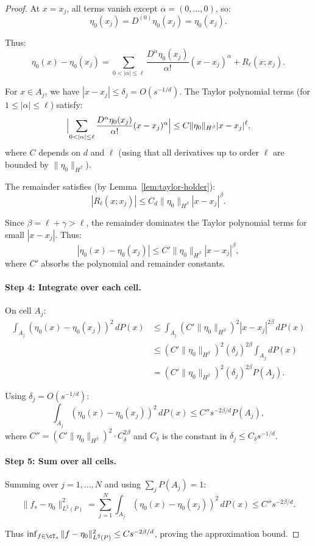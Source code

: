 \begin{proof}
At $x = x_j$, all terms vanish except $\alpha = (0,\ldots,0)$, so:
\[
\eta_0(x_j) = D^{(0)} \eta_0(x_j) = \eta_0(x_j).
\]

Thus:
\[
\eta_0(x) - \eta_0(x_j) = \sum_{0 < |\alpha| \le \ell} \frac{D^\alpha \eta_0(x_j)}{\alpha!} (x - x_j)^\alpha + R_\ell(x; x_j).
\]

For $x \in A_j$, we have $|x - x_j| \le \delta_j = O(s^{-1/d})$. The Taylor polynomial terms (for $1 \le |\alpha| \le \ell$) satisfy:
\[
\Bigl| \sum_{0 < |\alpha| \le \ell} \frac{D^\alpha \eta_0(x_j)}{\alpha!} (x - x_j)^\alpha \Bigr| \le C \|\eta_0\|_{H^\beta} |x - x_j|^\ell,
\]
where $C$ depends on $d$ and $\ell$ (using that all derivatives up to order $\ell$ are bounded by $\|\eta_0\|_{H^\beta}$).

The remainder satisfies (by Lemma~\ref{lem:taylor-holder}):
\[
|R_\ell(x; x_j)| \le C_d \|\eta_0\|_{H^\beta} |x - x_j|^\beta.
\]

Since $\beta = \ell + \gamma > \ell$, the remainder dominates the Taylor polynomial terms for small $|x - x_j|$. Thus:
\[
|\eta_0(x) - \eta_0(x_j)| \le C' \|\eta_0\|_{H^\beta} |x - x_j|^\beta,
\]
where $C'$ absorbs the polynomial and remainder constants.

\paragraph{Step 4: Integrate over each cell.}
On cell $A_j$:
\begin{align*}
\int_{A_j} (\eta_0(x) - \eta_0(x_j))^2 \, dP(x)
&\le \int_{A_j} (C' \|\eta_0\|_{H^\beta})^2 |x - x_j|^{2\beta} \, dP(x) \\
&\le (C' \|\eta_0\|_{H^\beta})^2 (\delta_j)^{2\beta} \int_{A_j} dP(x) \\
&= (C' \|\eta_0\|_{H^\beta})^2 (\delta_j)^{2\beta} P(A_j).
\end{align*}

Using $\delta_j = O(s^{-1/d})$:
\[
\int_{A_j} (\eta_0(x) - \eta_0(x_j))^2 \, dP(x) \le C'' s^{-2\beta/d} P(A_j),
\]
where $C'' = (C' \|\eta_0\|_{H^\beta})^2 \cdot C_\delta^{2\beta}$ and $C_\delta$ is the constant in $\delta_j \le C_\delta s^{-1/d}$.

\paragraph{Step 5: Sum over all cells.}
Summing over $j = 1, \ldots, N$ and using $\sum_j P(A_j) = 1$:
\[
\|f_s - \eta_0\|_{L^2(P)}^2 = \sum_{j=1}^N \int_{A_j} (\eta_0(x) - \eta_0(x_j))^2 \, dP(x) \le C'' s^{-2\beta/d}.
\]

Thus $\inf_{f \in \cT_s} \|f - \eta_0\|_{L^2(P)}^2 \le C s^{-2\beta/d}$, proving the approximation bound.
\end{proof}

